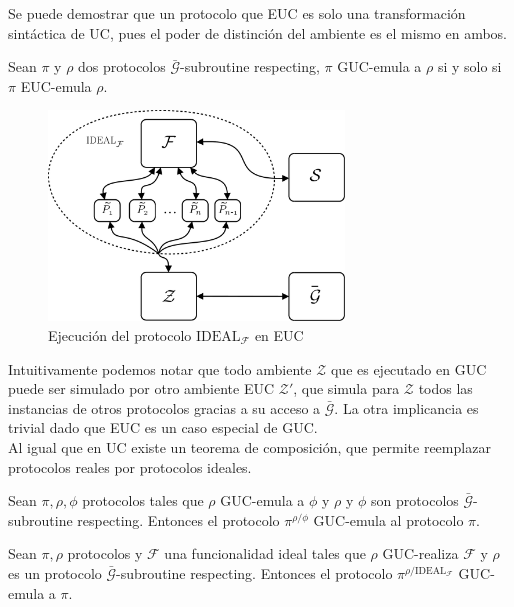 Se puede demostrar que un protocolo que EUC es solo una transformación sintáctica de UC, pues el poder
de distinción del ambiente es el mismo en ambos.

\begin{teorema}
Sean $\pi$ y $\rho$ dos protocolos $\bar{\mathcal{G}}$-subroutine respecting, $\pi$ GUC-emula a
$\rho$ si y solo si $\pi$ EUC-emula $\rho$.
\end{teorema}

\begin{figure}[hp]
    \centering
    \includegraphics[width=0.7\textwidth]{figs/mundo_ideal_guc}
    \caption{Ejecución del protocolo $\textrm{IDEAL}_\mathcal{F}$ en EUC}
    \label{fig:mundo_real_euc}
\end{figure}

Intuitivamente podemos notar que todo ambiente $\mathcal{Z}$ que es ejecutado en GUC puede ser simulado por
otro ambiente EUC $\mathcal{Z'}$, que simula para $\mathcal{Z}$ todos las instancias de otros protocolos gracias
a su acceso a $\bar{\mathcal{G}}$. La otra implicancia es trivial dado que EUC es un caso especial de GUC.\\

Al igual que en UC existe un teorema de composición, que permite reemplazar protocolos reales por protocolos
ideales.

\begin{teorema}
Sean $\pi, \rho, \phi$ protocolos tales que $\rho$ GUC-emula a $\phi$ y $\rho$ y $\phi$ son protocolos
$\bar{\mathcal{G}}$-subroutine respecting. Entonces el protocolo $\pi^{\rho/\phi}$ GUC-emula al protocolo $\pi$.
\end{teorema}

\begin{corolario}
Sean $\pi, \rho$ protocolos y $\mathcal{F}$ una funcionalidad ideal tales que $\rho$ GUC-realiza
$\mathcal{F}$ y $\rho$ es un protocolo $\bar{\mathcal{G}}$-subroutine respecting. Entonces el protocolo
$\pi^{\rho/\mathrm{IDEAL}_\mathcal{F}}$ GUC-emula a $\pi$.
\label{corolario:uc-realizacion}
\end{corolario}

